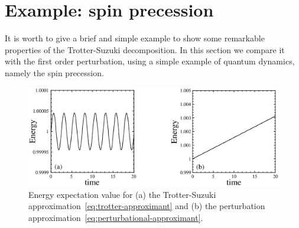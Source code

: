 \section{Example: spin precession}
It is worth to give a brief and simple example to show some remarkable properties of the Trotter-Suzuki decomposition. In this section we compare it with the first order perturbation, using a simple example of quantum dynamics, namely the spin precession.

\begin{figure}[t]
  \centering
   \includegraphics[width=12cm]{Plots/spin_evolution.eps}
   \caption{Energy expectation value for (a) the Trotter-Suzuki approximation~\eqref{eq:trotter-approximant} and (b) the perturbation approximation~\eqref{eq:perturbational-approximant}.} \label{plot:spin-evolution}
\end{figure}

